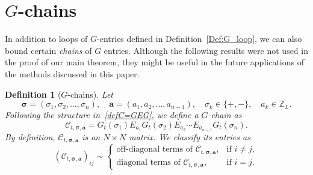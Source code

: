 \documentclass[10pt,reqno]{article}
\theoremstyle{plain} %
\newtheorem{definition}[theorem]{Definition}
\theoremstyle{remark}
\numberwithin{equation}{section}
\begin{document}
 
\appendix
 \section{\texorpdfstring{$G$}{G}-chains}\label{sec:Gchains}
 In addition to loops of \(G\)-entries defined in Definition~\ref{Def:G_loop}, we can also bound certain \textit{chains} of \( G \) entries. Although the following  results were not used in the proof of our main theorem, they might  be useful in the future applications of the methods discussed  in this paper. 

\begin{definition}[$G$-chains]\label{def_Gchain}
Let 
\[
\boldsymbol{\sigma} = (\sigma_1, \sigma_2, \ldots, \sigma_n), \quad \mathbf{a} = (a_1, a_2, \ldots, a_{n-1}), \quad \sigma_k \in \{+, -\}, \quad a_k \in \mathbb{Z}_L.
\]
Following the structure in~\eqref{defC=GEG}, we define a \emph{$G$-chain} as
\begin{equation}
    \mathcal{C}_{t, \boldsymbol{\sigma}, \mathbf{a}} = G_t(\sigma_1) E_{a_1} G_t(\sigma_2) E_{a_2} \cdots E_{a_{n-1}} G_t(\sigma_n).
\end{equation}
By definition, $\mathcal{C}_{t, \boldsymbol{\sigma}, \mathbf{a}}$ is an \( N \times N \) matrix. We classify its entries as
\[
\left( \mathcal{C}_{t, \boldsymbol{\sigma}, \mathbf{a}} \right)_{ij} \sim 
\begin{cases}
    \text{off-diagonal terms of } \mathcal{C}_{t, \boldsymbol{\sigma}, \mathbf{a}}, & \text{if } i \neq j, \\ 
    \text{diagonal terms of } \mathcal{C}_{t, \boldsymbol{\sigma}, \mathbf{a}}, & \text{if } i = j.
\end{cases}
\]
\end{definition}
\end{document}

